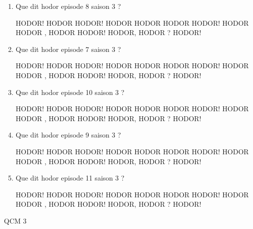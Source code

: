 \documentclass[a4paper, 11pt]{article}
\begin{document}
\begin{qcm}
\begin{enumerate}
			\item Que dit hodor episode 8 saison 3 ?
			\begin{tabenum} [1)]
				\tabenumitem HODOR!
				\tabenumitem HODOR HODOR!
				\tabenumitem HODOR HODOR HODOR HODOR!
				\tabenumitem HODOR HODOR , HODOR HODOR!
				\tabenumitem HODOR, HODOR ? HODOR!
			\end{tabenum}
		\vspace{5mm}

			\item Que dit hodor episode 7 saison 3 ?
			\begin{tabenum} [1)]
				\tabenumitem HODOR!
				\tabenumitem HODOR HODOR!
				\tabenumitem HODOR HODOR HODOR HODOR!
				\tabenumitem HODOR HODOR , HODOR HODOR!
				\tabenumitem HODOR, HODOR ? HODOR!
			\end{tabenum}
		\vspace{5mm}

			\item Que dit hodor episode 10 saison 3 ?
			\begin{tabenum} [1)]
				\tabenumitem HODOR!
				\tabenumitem HODOR HODOR!
				\tabenumitem HODOR HODOR HODOR HODOR!
				\tabenumitem HODOR HODOR , HODOR HODOR!
				\tabenumitem HODOR, HODOR ? HODOR!
			\end{tabenum}
		\vspace{5mm}

			\item Que dit hodor episode 9 saison 3 ?
			\begin{tabenum} [1)]
				\tabenumitem HODOR!
				\tabenumitem HODOR HODOR!
				\tabenumitem HODOR HODOR HODOR HODOR!
				\tabenumitem HODOR HODOR , HODOR HODOR!
				\tabenumitem HODOR, HODOR ? HODOR!
			\end{tabenum}
		\vspace{5mm}

			\item Que dit hodor episode 11 saison 3 ?
			\begin{tabenum} [1)]
				\tabenumitem HODOR!
				\tabenumitem HODOR HODOR!
				\tabenumitem HODOR HODOR HODOR HODOR!
				\tabenumitem HODOR HODOR , HODOR HODOR!
				\tabenumitem HODOR, HODOR ? HODOR!
			\end{tabenum}
		\vspace{5mm}

		\end{enumerate}
	\end{qcm}
	\newpage
	
	QCM 3
	
\end{document}
